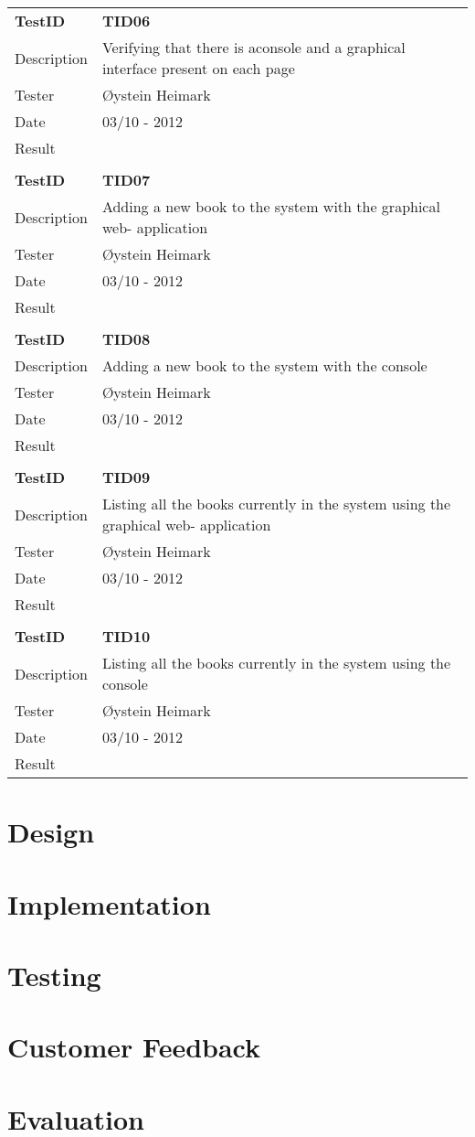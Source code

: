 \begin{table}
\begin{tabular}{ l p{13cm} }
\bf{TestID}		&\bf{TID06}			\\
Description	&Verifying that there is aconsole and a graphical interface present on each page\\
Tester		&Øystein Heimark	\\
Date			&03/10 - 2012	\\
Result		&				\\
\hline \\ [-2.0ex]

\bf{TestID}		&\bf{TID07}			\\
Description	&Adding a new book to the system with the graphical web- application	\\
Tester		&Øystein Heimark	\\
Date			&03/10 - 2012	\\
Result		&				\\
\hline \\ [-2.0ex]

\bf{TestID}		&\bf{TID08}			\\
Description	&Adding a new book to the system with the console	\\
Tester		&Øystein Heimark	\\
Date			&03/10 - 2012	\\
Result		&				\\
\hline \\ [-2.0ex]

\bf{TestID}		&\bf{TID09}			\\
Description	&Listing all the books currently in the system using the graphical web- application	\\
Tester		&Øystein Heimark	\\
Date			&03/10 - 2012	\\
Result		&				\\
\hline \\ [-2.0ex]

\bf{TestID}		&\bf{TID10}			\\
Description	&Listing all the books currently in the system using the console	\\
Tester		&Øystein Heimark	\\
Date			&03/10 - 2012	\\
Result		&				\\
\hline
\end{tabular}
\label{table:sp1testresults}
\end{table}


\section{Design}
\section{Implementation}
\section{Testing}
\section{Customer Feedback}
\section{Evaluation}